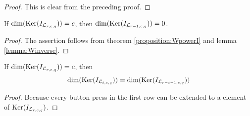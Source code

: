 \begin{proof}
	This is clear from the preceding proof.
\end{proof}

\begin{proposition}
	If $\dim(\operatorname{Ker}(I_{\mathcal{L}_{r,c,q}})) = c$, then
	$\dim(\operatorname{Ker}(I_{\mathcal{L}_{r-1,c,q}})) = 0$. 
\end{proposition}

\begin{proof}
	The assertion follows from theorem \ref{proposition:WpowerI} and lemma
	\ref{lemma:Winverse}.
\end{proof}

\begin{proposition}
	If $\dim(\operatorname{Ker}(I_{\mathcal{L}_{r,c,q}})) = c$, then
	\[
		\dim(\operatorname{Ker}(I_{\mathcal{L}_{t,c,q}})) = \dim(\operatorname{Ker}(I_{\mathcal{L}_{r-t-1,c,q}}))
	\]
\end{proposition}

\begin{proof}
	Because every button press in the first row can be extended to a element
	of $\operatorname{Ker}(I_{\mathcal{L}_{r,c,q}})$.
\end{proof}
